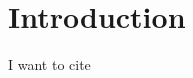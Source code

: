 \documentclass[./main]{subfiles}
\begin{document}
\section{Introduction}
I want to cite \citet{chettyAreMicroMacro2011}

\end{document}
